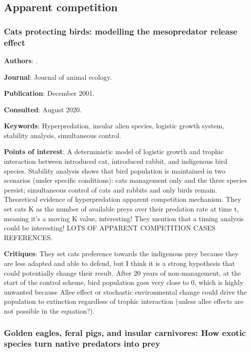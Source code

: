 \documentclass[12pt,a4paper]{article}
\begin{document}
\subsection*{Apparent competition}

\subsubsection*{Cats protecting birds: modelling the mesopredator release effect}

\textbf{Authors}: \cite{courchamp1999cats}.

\textbf{Journal}: Journal of animal ecology.

\textbf{Publication}: December 2001.

\textbf{Consulted}: August 2020.

\textbf{Keywords}: Hyperpredation, insular alien species, logistic growth system, stability analysis, simultaneous control.

\textbf{Points of interest}: A deterministic model of logistic growth and trophic interaction between introduced cat, introduced rabbit, and indigenous bird species. Stability analysis shows that bird population is maintained in two scenarios (under specific conditions): cats management only and the three species persist; simultaneous control of cats and rabbits and only birds remain. Theoretical evidence of hyperpredation apparent competition mechanism. They set cats K as the number of available preys over their predation rate at time t, meaning it's a moving K value, interesting! They mention that a timing analysis could be interesting!
LOTS OF APPARENT COMPETITION CASES REFERENCES.

\textbf{Critiques}: They set cats preference towards the indigenous prey because they are less adapted and able to defend, but I think it is a strong hypothesis that could potentially change their result. After 20 years of non-management, at the start of the control scheme, bird population goes very close to 0, which is highly unwanted because Allee effect or stochastic environmental change could drive the population to extinction regardless of trophic interaction (unless allee effects are not possible in the equation?).

\newpage

\subsubsection*{Golden eagles, feral pigs, and insular carnivores: How exotic species turn native predators into prey}
\end{document}
